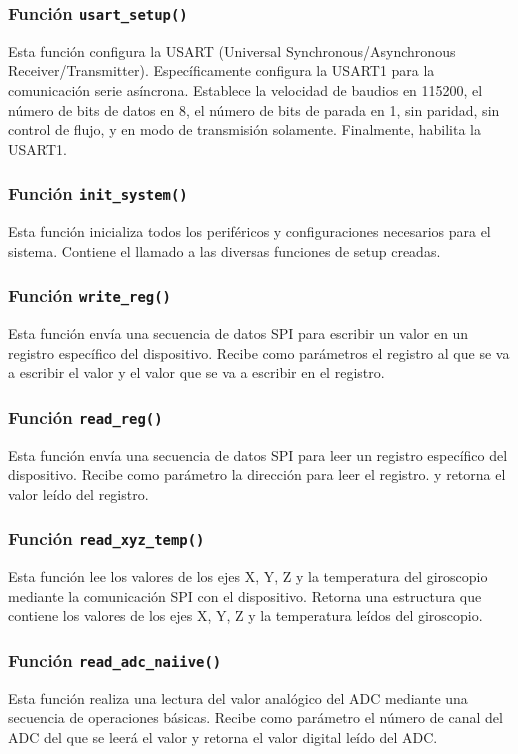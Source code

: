 \subsubsection{Función \texttt{usart\_setup()}}
Esta función configura la USART (Universal Synchronous/Asynchronous Receiver/Transmitter). Específicamente configura la USART1 para la comunicación serie asíncrona. Establece la velocidad de baudios en 115200, el número de bits de datos en 8, el número de bits de parada en 1, sin paridad, sin control de flujo, y en modo de transmisión solamente. Finalmente, habilita la USART1.


\subsubsection{Función \texttt{init\_system()}}
Esta función inicializa todos los periféricos y configuraciones necesarios para el sistema. Contiene el llamado a las diversas funciones de setup creadas.
\subsubsection{Función \texttt{write\_reg()}}
Esta función envía una secuencia de datos SPI para escribir un valor en un registro específico del dispositivo. Recibe como parámetros el registro al que se va a escribir el valor y el valor que se va a escribir en el registro.
\subsubsection{Función \texttt{read\_reg()}}
Esta función envía una secuencia de datos SPI para leer un registro específico del dispositivo. Recibe como parámetro la dirección para leer el registro. y retorna el valor leído del registro.
\subsubsection{Función \texttt{read\_xyz\_temp()}}
Esta función lee los valores de los ejes X, Y, Z y la temperatura del giroscopio mediante la comunicación SPI con el dispositivo. Retorna una estructura que contiene los valores de los ejes X, Y, Z y la temperatura leídos del giroscopio.
\subsubsection{Función \texttt{read\_adc\_naiive()}}
Esta función realiza una lectura del valor analógico del ADC mediante una secuencia de operaciones básicas. Recibe como parámetro el número de canal del ADC del que se leerá el valor y retorna el valor digital leído del ADC.
